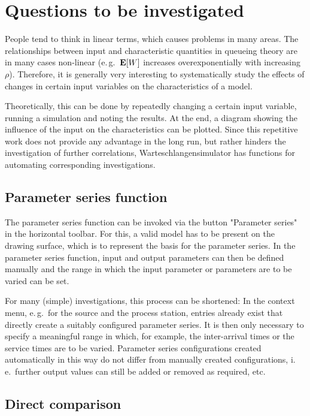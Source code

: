 \documentclass{svmono}
\begin{document}
\chapter{Questions to be investigated}

People tend to think in linear terms, which causes problems in many areas. The relationships between input and characteristic quantities in queueing theory are in many cases non-linear (e.\,g.\ ${\bf E}[W]$ increases overexponentially with increasing $\rho$). Therefore, it is generally very interesting to systematically study the effects of changes in certain input variables on the characteristics of a model.

Theoretically, this can be done by repeatedly changing a certain input variable, running a simulation and noting the results. At the end, a diagram showing the influence of the input on the characteristics can be plotted. Since this repetitive work does not provide any advantage in the long run, but rather hinders the investigation of further correlations, Warteschlangensimulator has functions for automating corresponding investigations.



\section{Parameter series function}

The parameter series function can be invoked via the button "Parameter series" in the horizontal toolbar. For this, a valid model has to be present on the drawing surface, which is to represent the basis for the parameter series. In the parameter series function, input and output parameters can then be defined manually and the range in which the input parameter or parameters are to be varied can be set.

For many (simple) investigations, this process can be shortened: In the context menu, e.\,g.\ for the source and the process station, entries already exist that directly create a suitably configured parameter series. It is then only necessary to specify a meaningful range in which, for example, the inter-arrival times or the service times are to be varied. Parameter series configurations created automatically in this way do not differ from manually created configurations, i.\,e.\ further output values can still be added or removed as required, etc.



\section{Direct comparison}
\end{document}
